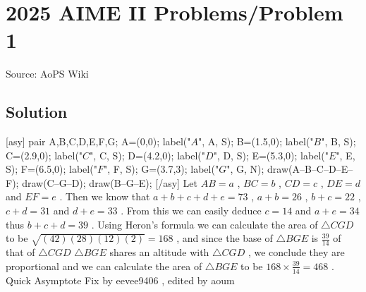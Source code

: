 \documentclass[12pt]{article}
\begin{document}
\section*{{2025 AIME II Problems/Problem 1}}
Source: AoPS Wiki

\subsection*{Solution}
[asy] pair A,B,C,D,E,F,G; A=(0,0); label("$A$", A, S); B=(1.5,0); label("$B$", B, S); C=(2.9,0); label("$C$", C, S); D=(4.2,0); label("$D$", D, S); E=(5.3,0); label("$E$", E, S); F=(6.5,0); label("$F$", F, S); G=(3.7,3); label("$G$", G, N); draw(A--B--C--D--E--F); draw(C--G--D); draw(B--G--E); [/asy] Let $AB=a$ , $BC=b$ , $CD=c$ , $DE=d$ and $EF=e$ . Then we know that $a+b+c+d+e=73$ , $a+b=26$ , $b+c=22$ , $c+d=31$ and $d+e=33$ . From this we can easily deduce $c=14$ and $a+e=34$ thus $b+c+d=39$ . Using Heron's formula we can calculate the area of $\triangle{CGD}$ to be $\sqrt{(42)(28)(12)(2)}=168$ , and since the base of $\triangle{BGE}$ is $\frac{39}{14}$ of that of $\triangle{CGD}$ $\triangle{BGE}$ shares an altitude with $\triangle{CGD}$ , we conclude they are proportional and we can calculate the area of $\triangle{BGE}$ to be $168\times \frac{39}{14}=\boxed{468}$ . ~ Quick Asymptote Fix by eevee9406 , edited by aoum
\end{document}
